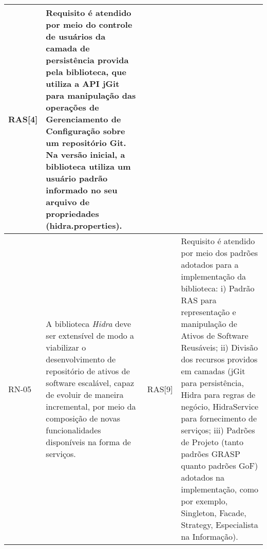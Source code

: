 \begin{longtable}{ | l | p{4cm} | p{2cm} | p{6cm} |}
	RAS[4]
	& Requisito é atendido por meio do controle de usuários da camada de persistência provida pela biblioteca, que utiliza a API jGit para manipulação das operações de Gerenciamento de Configuração sobre um repositório Git. Na versão inicial, a biblioteca utiliza um usuário padrão informado no seu arquivo de propriedades (hidra.properties).
	\\ \hline

	RN-05
	& A biblioteca \textit{Hidra} deve ser extensível de modo a viabilizar o desenvolvimento de repositório de ativos de software escalável, capaz de evoluir de maneira incremental, por meio da composição de novas funcionalidades disponíveis na forma de serviços.
	& RAS[9] 
	& Requisito é atendido por meio dos padrões adotados para a implementação da biblioteca: i) Padrão RAS para representação e manipulação de Ativos de Software Reusáveis; ii) Divisão dos recursos providos em camadas (jGit para persistência, Hidra para regras de negócio, HidraService para fornecimento de serviços; iii) Padrões de Projeto (tanto padrões GRASP quanto padrões GoF) adotados na implementação, como por exemplo, Singleton, Facade, Strategy, Especialista na Informação).
 \\ \hline 

\end{longtable}
